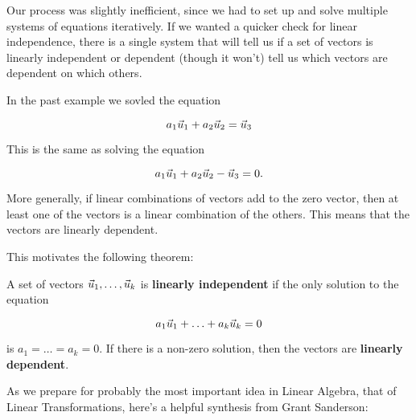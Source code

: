 \documentclass{ximera}
\begin{document}
\begin{remark}
Our process was slightly inefficient, since we had to set up and solve multiple systems of equations iteratively. If we wanted a quicker check for linear independence, there is a single system that will tell us if a set of vectors is linearly independent or dependent (though it won't) tell us which vectors are dependent on which others. 

In the past example we sovled the equation

$$a_1\vec{u}_1+a_2\vec{u}_2=\vec{u}_3$$

This is the same as solving the equation

$$a_1\vec{u}_1+a_2\vec{u}_2-\vec{u}_3=0.$$

More generally, if linear combinations of vectors add to the zero vector, then at least one of the vectors is a linear combination of the others. This means that the vectors are linearly dependent.

This motivates the following theorem:

\begin{theorem}

  A set of vectors $\vec{u}_1,\ldots,\vec{u}_k$ is \textbf{linearly independent} if the only solution to the equation

  $$a_1\vec{u}_1+\ldots+a_k\vec{u}_k=0$$

  is $a_1=\ldots=a_k=0$. If there is a non-zero solution, then the vectors are \textbf{linearly dependent}.
\end{theorem}







\end{remark}



As we prepare for probably the most important idea in Linear Algebra, that of Linear Transformations, here's a helpful synthesis from Grant Sanderson:

\end{document}

